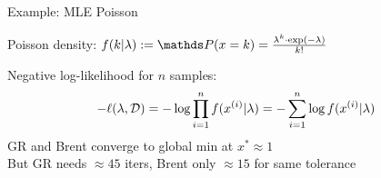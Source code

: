 \documentclass[11pt,compress,t,notes=noshow, xcolor=table]{beamer}
\newcommand{\xii}{x^{(i)}} %
\begin{document}
\begin{framei}{Example: MLE Poisson}
\item Poisson density: $f(k|\lambda) := \P(x = k) = \frac{\lambda^k \cdot \exp(-\lambda)}{k!}$
\item Negative log-likelihood for $n$ samples:
\begin{equation*}
- \ell(\lambda, \mathcal{D}) = - \log \prodin  f(\xii | \lambda) =  - \sumin \log f(\xii | \lambda) 
\end{equation*}
GR and Brent converge to global min at $x^\ast \approx 1$ \\
But GR needs $\approx 45$ iters, Brent only $\approx 15$ for same tolerance
\end{framei}

\endlecture
\end{document}
